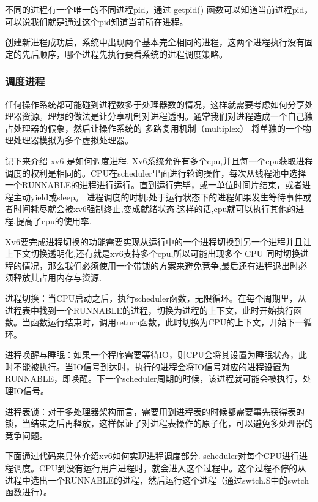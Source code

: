 不同的进程有一个唯一的不同进程pid，通过 getpid() 函数可以知道当前进程pid，可以说我们就是通过这个pid知道当前所在进程。

创建新进程成功后，系统中出现两个基本完全相同的进程，这两个进程执行没有固定的先后顺序，哪个进程先执行要看系统的进程调度策略。

\subsubsection{调度进程}

任何操作系统都可能碰到进程数多于处理器数的情况，这样就需要考虑如何分享处理器资源。理想的做法是让分享机制对进程透明。通常我们对进程造成一个自己独占处理器的假象，然后让操作系统的 多路复用机制（multiplex） 将单独的一个物理处理器模拟为多个虚拟处理器。

记下来介绍 xv6 是如何调度进程.
Xv6系统允许有多个cpu,并且每一个cpu获取进程调度的权利是相同的。CPU在scheduler里面进行轮询操作，每次从线程池中选择一个RUNNABLE的进程进行运行。直到运行完毕，或一单位时间片结束，或者进程主动yield或sleep。
进程调度的时机:处于运行状态下的进程如果发生等待事件或者时间耗尽就会被xv6强制终止,变成就绪状态.这样的话,cpu就可以执行其他的进程,提高了cpu的使用率.

Xv6要完成进程切换的功能需要实现从运行中的一个进程切换到另一个进程并且让上下文切换透明化,还有就是xv6支持多个cpu,所以可能出现多个 CPU 同时切换进程的情况，那么我们必须使用一个带锁的方案来避免竞争,最后还有进程退出时必须释放其占用内存与资源.

进程切换：当CPU启动之后，执行scheduler函数，无限循环。在每个周期里，从进程表中找到一个RUNNABLE的进程，切换为进程的上下文，此时开始执行函数。当函数运行结束时，调用return函数，此时切换为CPU的上下文，开始下一循环。

进程唤醒与睡眠：如果一个程序需要等待IO，则CPU会将其设置为睡眠状态，此时不能被执行。当IO信号到达时，执行的进程会将IO信号对应的进程设置为RUNNABLE，即唤醒。下一个scheduler周期的时候，该进程就可能会被执行，处理IO信号。

进程表锁：对于多处理器架构而言，需要用到进程表的时候都需要事先获得表的锁，当结束之后再释放，这样保证了对进程表操作的原子化，可以避免多处理器的竞争问题。

下面通过代码来具体介绍xv6如何实现进程调度部分.
scheduler对每个CPU进行进程调度。CPU到没有运行用户进程时，就会进入这个过程中。这个过程不停的从进程中选出一个RUNNABLE的进程，然后运行这个进程（通过swtch.S中的swtch函数进行）。

